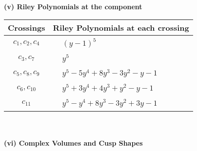 \documentclass[1p]{elsarticle_modified}
\theoremstyle{definition}
\begin{document}
\newpage\renewcommand{\arraystretch}{1}
\flushleft \textbf{(v) Riley Polynomials at the component}\newline \\
\begin{tabular}{m{50pt}|m{274pt}}
Crossings & \hspace{64pt}Riley Polynomials at each crossing \\
\hline $$\begin{aligned}c_{1},c_{2},c_{4}\end{aligned}$$&$\begin{aligned}
&(y-1)^5
\end{aligned}$\\
\hline $$\begin{aligned}c_{3},c_{7}\end{aligned}$$&$\begin{aligned}
&y^5
\end{aligned}$\\
\hline $$\begin{aligned}c_{5},c_{8},c_{9}\end{aligned}$$&$\begin{aligned}
&y^5-5 y^4+8 y^3-3 y^2- y-1
\end{aligned}$\\
\hline $$\begin{aligned}c_{6},c_{10}\end{aligned}$$&$\begin{aligned}
&y^5+3 y^4+4 y^3+y^2- y-1
\end{aligned}$\\
\hline $$\begin{aligned}c_{11}\end{aligned}$$&$\begin{aligned}
&y^5- y^4+8 y^3-3 y^2+3 y-1
\end{aligned}$\\
\hline
\end{tabular}\\~\\
\newpage\flushleft \textbf{(vi) Complex Volumes and Cusp Shapes}
\end{document}
